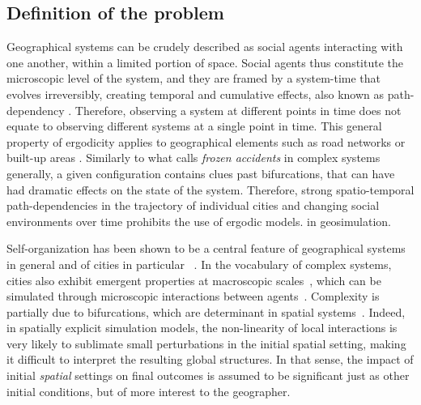 \documentclass[preprint,5p,times,twocolumn,authoryear]{elsarticle}
\begin{document}
\subsection{Definition of the problem}

Geographical systems can be crudely described as social agents interacting with one another, within a limited portion of space. Social agents thus constitute the microscopic level of the system, and they are framed by a system-time that evolves irreversibly, creating temporal and cumulative effects, also known as path-dependency \citep{arthur1994increasing}. Therefore, observing a system at different points in time does not equate to observing different systems at a single point in time. This general property of ergodicity applies to geographical elements such as road networks or built-up areas \citep{pumain2003approche}. Similarly to what \citet{gell1995quark} calls \emph{frozen accidents} in complex systems generally, a given configuration contains clues  past bifurcations, that can have had dramatic effects on the state of the system. Therefore, strong spatio-temporal path-dependencies in the trajectory of individual cities and changing social environments over time prohibits the use of ergodic models.  in geosimulation.


Self-organization has been shown to be a central feature of geographical systems in general and of cities in particular ~\citep{AllenSanglier1981,saint1989villes, Portugali2000}. In the vocabulary of complex systems, cities also exhibit emergent properties at macroscopic scales~\citep{pumain2006hierarchy, AzizAlaouiBertelle2009}, which can be simulated through microscopic interactions between agents~\citep{Wu2002, Batty2007}. Complexity is partially due to bifurcations, which are determinant in spatial systems~\citep{Wilson1981, Wilson2002}. Indeed, in spatially explicit simulation models, the non-linearity of local interactions is very likely to sublimate small perturbations in the initial spatial setting, making it difficult to interpret the resulting global structures. In that sense, the impact of initial \emph{spatial} settings on final outcomes is assumed to be significant just as other initial conditions, but of more interest to the geographer. \\
\end{document}
